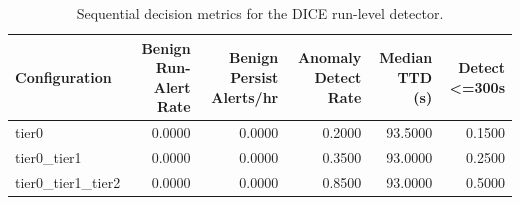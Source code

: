 \begin{table}[t]
\centering
\caption{Sequential decision metrics for the DICE run-level detector.}
\label{tab:dice_sequential_metrics}
\footnotesize
\begin{tabular}{lrrrrr}
\toprule
Configuration & Benign Run-Alert Rate & Benign Persist Alerts/hr & Anomaly Detect Rate & Median TTD (s) & Detect <=300s \\
\midrule
tier0 & 0.0000 & 0.0000 & 0.2000 & 93.5000 & 0.1500 \\
tier0_tier1 & 0.0000 & 0.0000 & 0.3500 & 93.0000 & 0.2500 \\
tier0_tier1_tier2 & 0.0000 & 0.0000 & 0.8500 & 93.0000 & 0.5000 \\
\bottomrule
\end{tabular}

\end{table}
